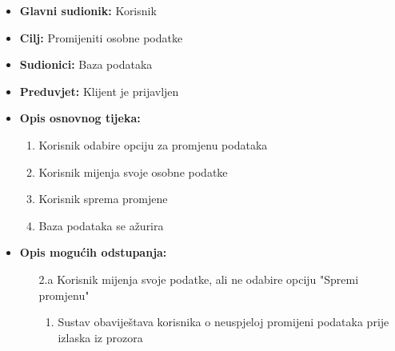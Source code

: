                         \noindent {}
					\begin{itemize}
	
						\item \textbf{Glavni sudionik: }Korisnik
						\item  \textbf{Cilj:} Promijeniti osobne podatke
						\item  \textbf{Sudionici:} Baza podataka
						\item  \textbf{Preduvjet:} Klijent je prijavljen
						\item  \textbf{Opis osnovnog tijeka:}
						
						\item[] \begin{enumerate}
							\item Korisnik odabire opciju za promjenu podataka
                                \item Korisnik mijenja svoje osobne podatke
                                \item Korisnik sprema promjene
                                \item Baza podataka se ažurira
						\end{enumerate}

                            \item  \textbf{Opis mogućih odstupanja:}
						
						\item[] \begin{enumerate}
	
							\item[2.a] Korisnik mijenja svoje podatke, ali ne odabire opciju "Spremi promjenu"
							\item[] \begin{enumerate}
								
								\item Sustav obaviještava korisnika o neuspjeloj promijeni podataka prije izlaska iz prozora\\
								
							\end{enumerate}
			
							
						\end{enumerate}
						
					\end{itemize}


